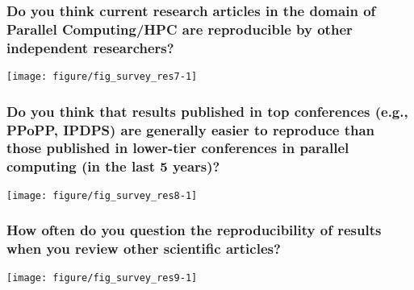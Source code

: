 \documentclass{article}\usepackage[]{graphicx}\usepackage[]{color}
\newenvironment{knitrout}{}{}
\begin{document}
\subsubsection{Do you think current research articles in the domain of Parallel Computing/HPC are reproducible by other independent researchers?}

\begin{knitrout}
\color{fgcolor}

{\centering \texttt{[image: figure/fig\_survey\_res7-1]} 

}



\end{knitrout}





\subsubsection{Do you think that results published in top conferences (e.g., PPoPP, IPDPS) are generally easier to reproduce than those published in lower-tier conferences in parallel computing (in the last 5 years)?}

\begin{knitrout}
\color{fgcolor}

{\centering \texttt{[image: figure/fig\_survey\_res8-1]} 

}



\end{knitrout}


\newpage


\subsubsection{How often do you question the reproducibility of results when you review other scientific articles?}

\begin{knitrout}
\color{fgcolor}

{\centering \texttt{[image: figure/fig\_survey\_res9-1]} 

}



\end{knitrout}
\end{document}
